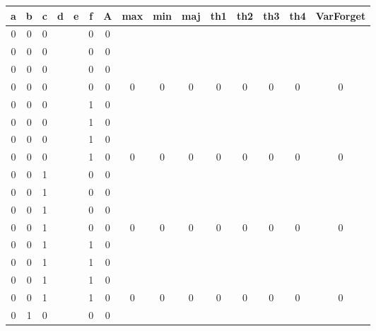 \begin{table}[!tb]
    \centering
    \begin{tabular}{|c|c|c|c|c|c|c|c|c|c|c|c|c|c|c|}
        \hline
        \textbf{a} & \textbf{b} & \textbf{c} & \textbf{d} & \textbf{e} & \textbf{f} & \textbf{A} & \textbf{max} & \textbf{min} & \textbf{maj} & \textbf{th1} & \textbf{th2} & \textbf{th3} & \textbf{th4} & \textbf{VarForget} \\ \hline
        \rowcolor{gray!40} 0 & 0 & 0 &  &  & 0 & 0 &  &  &  &  &  &  &  &  \\ \hline
        \rowcolor{gray!40} 0 & 0 & 0 &  &  & 0 & 0 &  &  &  &  &  &  &  &  \\ \hline
        \rowcolor{gray!40} 0 & 0 & 0 &  &  & 0 & 0 &  &  &  &  &  &  &  &  \\ \hline
        \rowcolor{gray!40} 0 & 0 & 0 &  &  & 0 & 0 & 0 & 0 & 0 & 0 & 0 & 0 & 0 & 0 \\ \hline
        \rowcolor{blue!40} 0 & 0 & 0 &  &  & 1 & 0 &  &  &  &  &  &  &  &  \\ \hline
        \rowcolor{blue!40} 0 & 0 & 0 &  &  & 1 & 0 &  &  &  &  &  &  &  &  \\ \hline
        \rowcolor{blue!40} 0 & 0 & 0 &  &  & 1 & 0 &  &  &  &  &  &  &  &  \\ \hline
        \rowcolor{blue!40} 0 & 0 & 0 &  &  & 1 & 0 & 0 & 0 & 0 & 0 & 0 & 0 & 0 & 0 \\ \hline
        \rowcolor{red!40} 0 & 0 & 1 &  &  & 0 & 0 &  &  &  &  &  &  &  &  \\ \hline
        \rowcolor{red!40} 0 & 0 & 1 &  &  & 0 & 0 &  &  &  &  &  &  &  &  \\ \hline
        \rowcolor{red!40} 0 & 0 & 1 &  &  & 0 & 0 &  &  &  &  &  &  &  &  \\ \hline
        \rowcolor{red!40} 0 & 0 & 1 &  &  & 0 & 0 & 0 & 0 & 0 & 0 & 0 & 0 & 0 & 0 \\ \hline
        \rowcolor{green!40} 0 & 0 & 1 &  &  & 1 & 0 &  &  &  &  &  &  &  &  \\ \hline
        \rowcolor{green!40} 0 & 0 & 1 &  &  & 1 & 0 &  &  &  &  &  &  &  &  \\ \hline
        \rowcolor{green!40} 0 & 0 & 1 &  &  & 1 & 0 &  &  &  &  &  &  &  &  \\ \hline
        \rowcolor{green!40} 0 & 0 & 1 &  &  & 1 & 0 & 0 & 0 & 0 & 0 & 0 & 0 & 0 & 0 \\ \hline
        \rowcolor{yellow!40} 0 & 1 & 0 &  &  & 0 & 0 &  &  &  &  &  &  &  &  \\ \hline

\end{tabular}
\end{table}
